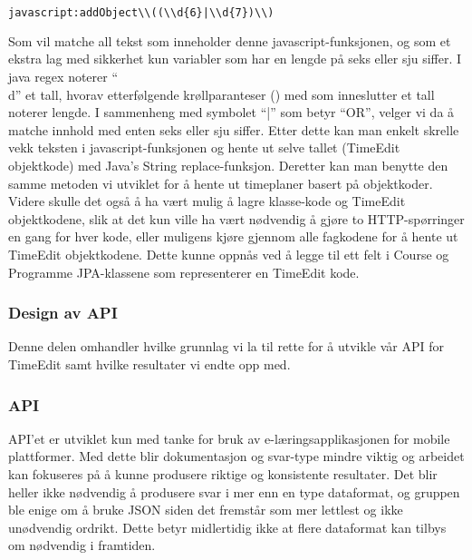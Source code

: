 \documentclass[../main.tex]{subfiles}
\begin{document}
\begin{lstlisting}[language=HTML, frame=single, caption={asdasdsadasdasdasdsadsadasdasdsadsa}]
javascript:addObject\\((\\d{6}|\\d{7})\\)
\end{lstlisting}

Som vil matche all tekst som inneholder denne javascript-funksjonen, og som et ekstra lag med sikkerhet kun variabler som har en lengde på seks eller sju siffer. I java regex noterer “\\d” et tall, hvorav etterfølgende krøllparanteser ({}) med som inneslutter et tall noterer lengde. I sammenheng med symbolet “|” som betyr “OR”, velger vi da å matche innhold med enten seks eller sju siffer.
Etter dette kan man enkelt skrelle vekk teksten i javascript-funksjonen og hente ut selve tallet (TimeEdit objektkode) med Java’s String replace-funksjon.
Deretter kan man benytte den samme metoden vi utviklet for å hente ut timeplaner basert på objektkoder. Videre skulle det også å ha vært mulig å lagre klasse-kode og TimeEdit objektkodene, slik at det kun ville ha vært nødvendig å gjøre to HTTP-spørringer en gang for hver kode, eller muligens kjøre gjennom alle fagkodene for å hente ut TimeEdit objektkodene. Dette kunne oppnås ved å legge til ett felt i Course og Programme JPA-klassene som representerer en TimeEdit kode. 

\subsubsection{Design av API}
Denne delen omhandler hvilke grunnlag vi la til rette for å utvikle vår API for TimeEdit samt hvilke resultater vi endte opp med.

\subsubsection{API}
API’et er utviklet kun med tanke for bruk av e-læringsapplikasjonen for mobile plattformer. Med dette blir dokumentasjon og svar-type mindre viktig og arbeidet kan fokuseres på å kunne produsere riktige og konsistente resultater. Det blir heller ikke nødvendig å produsere svar i mer enn en type dataformat, og gruppen ble enige om å bruke JSON siden det fremstår som mer lettlest og ikke unødvendig ordrikt. Dette betyr midlertidig ikke at flere dataformat kan tilbys om nødvendig i framtiden.
\end{document}
